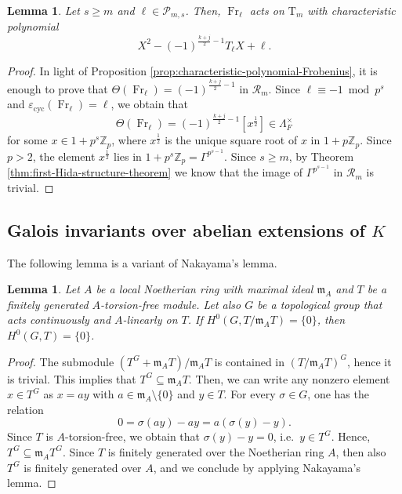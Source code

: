 \documentclass[12pt,reqno]{amsart}
\newtheorem{lemma}[theorem]{Lemma}
\theoremstyle{definition}
\theoremstyle{remark}
\newcommand{\numberset}{\mathbb}
\newcommand{\Z}{\numberset{Z}}
\newcommand{\T}{\boldsymbol{\mathrm{T}}}
\newcommand{\calR}{\mathcal{R}}
\DeclareMathOperator{\Fr}{Fr}
\newcommand{\cyc}{\mathrm{cyc}}
\newcommand{\e}{\varepsilon}
\newcommand{\gs}{\sigma}
\newcommand{\gL}{\Lambda}
\newcommand{\m}{\mathfrak{m}}
\begin{document}
\begin{lemma}
 \label{lem:charachteristic-polynomial-frobenius-Tm}
     Let $s\ge m$ and $\ell\in\mathcal{P}_{m,s}$. Then, $\Fr_\ell$ acts on $\T_m$ with characteristic polynomial
     \begin{equation*}
         X^2-(-1)^{\frac{k+j}{2}-1} T_\ell X+\ell.
     \end{equation*}
 \end{lemma}
 \begin{proof}
     In light of Proposition \ref{prop:characteristic-polynomial-Frobenius}, it is enough to prove that $\Theta(\Fr_\ell)=(-1)^{\frac{k+j}{2}-1}$ in $\calR_m$. Since $\ell\equiv -1\bmod{p^s}$ and $\e_{\cyc}(\Fr_\ell)=\ell$, we obtain that
     \begin{equation*}
         \Theta(\Fr_\ell)=(-1)^{\frac{k+j}{2}-1}[x^{\frac{1}{2}}]\in\gL_F^\times
     \end{equation*}
     for some $x\in1+p^s\Z_p$, where $x^{\frac{1}{2}}$ is the unique square root of $x$ in $1+p\Z_p$. Since $p>2$, the element $x^{\frac{1}{2}}$ lies in $1+p^s\Z_p=\Gamma^{p^{s-1}}$. Since $s\ge m$, by Theorem \ref{thm:first-Hida-structure-theorem} we know that the image of $\Gamma^{p^{s-1}}$ in $\calR_m$ is trivial.
 \end{proof}




\subsection{Galois invariants over abelian extensions of $K$}

The following lemma is a variant of Nakayama's lemma.

\begin{lemma}\label{lem:nakayama-for-Galois-representation}
    Let $A$ be a local Noetherian ring with maximal ideal $\m_A$ and $T$ be a finitely generated $A$-torsion-free module. Let also $G$ be a topological group that acts continuously and $A$-linearly on $T$. If $H^0(G,T/\mathfrak{m}_A T)=\{0\}$, then $H^0(G,T)=\{0\}$.
\end{lemma}
\begin{proof}
    The submodule $(T^G+\mathfrak{m}_A T)/\mathfrak{m}_A T$ is contained in $(T/\mathfrak{m}_A T)^G$, hence it is trivial. This implies that $T^G\subseteq \mathfrak{m}_A T$. Then, we can write any nonzero element $x\in T^G$ as $x=ay$ with $a\in\mathfrak{m}_A\setminus\{0\}$ and $y\in T$. For every $\gs\in G$, one has the relation
    \begin{equation*}
        0=\gs(ay)-ay=a(\gs(y)-y).
    \end{equation*}
    Since $T$ is $A$-torsion-free, we obtain that $\gs(y)-y=0$, i.e.~$y\in T^G$. Hence, $T^G\subseteq \mathfrak{m}_A T^G$. Since $T$ is finitely generated over the Noetherian ring $A$, then also $T^G$ is finitely generated over $A$, and we conclude by applying Nakayama's lemma.
\end{proof}
\end{document}
